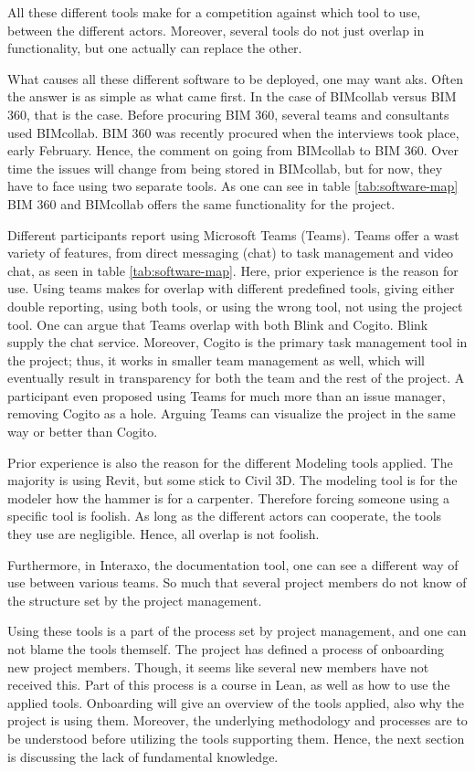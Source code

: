 All these different tools make for a competition against which tool to use, between the different actors. Moreover, several tools do not just overlap in functionality, but one actually can replace the other. 

What causes all these different software to be deployed, one may want aks. Often the answer is as simple as what came first. In the case of BIMcollab versus BIM 360, that is the case. Before procuring BIM 360, several teams and consultants used BIMcollab. BIM 360 was recently procured when the interviews took place, early February. Hence, the comment on going from BIMcollab to BIM 360. Over time the issues will change from being stored in BIMcollab, but for now, they have to face using two separate tools. As one can see in table \ref{tab:software-map} BIM 360 and BIMcollab offers the same functionality for the project.

Different participants report using Microsoft Teams (Teams). Teams offer a wast variety of features, from direct messaging (chat) to task management and video chat, as seen in table \ref{tab:software-map}. Here, prior experience is the reason for use. Using teams makes for overlap with different predefined tools, giving either double reporting, using both tools, or using the wrong tool, not using the project tool. One can argue that Teams overlap with both Blink and Cogito. Blink supply the chat service. Moreover, Cogito is the primary task management tool in the project; thus, it works in smaller team management as well, which will eventually result in transparency for both the team and the rest of the project. A participant even proposed using Teams for much more than an issue manager, removing Cogito as a hole. Arguing Teams can visualize the project in the same way or better than Cogito.

Prior experience is also the reason for the different Modeling tools applied. The majority is using Revit, but some stick to Civil 3D. The modeling tool is for the modeler how the hammer is for a carpenter. Therefore forcing someone using a specific tool is foolish. As long as the different actors can cooperate, the tools they use are negligible. Hence, all overlap is not foolish.

Furthermore, in Interaxo, the documentation tool, one can see a different way of use between various teams. So much that several project members do not know of the structure set by the project management. 

Using these tools is a part of the process set by project management, and one can not blame the tools themself. The project has defined a process of onboarding new project members. Though, it seems like several new members have not received this. Part of this process is a course in Lean, as well as how to use the applied tools. Onboarding will give an overview of the tools applied, also why the project is using them. Moreover, the underlying methodology and processes are to be understood before utilizing the tools supporting them. Hence, the next section is discussing the lack of fundamental knowledge.

